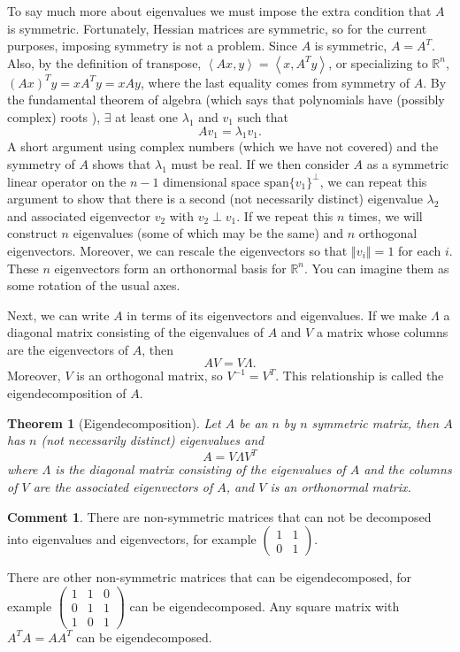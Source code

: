 \documentclass[12pt,reqno]{amsart}
\newtheorem{theorem}{Theorem}[section]
\theoremstyle{definition}
\newtheorem{remark}{Comment}[section]
\def\R{\mathbb{R}}
\newcommand{\iprod}[2]{\left\langle {#1} , {#2} \right\rangle}
\newcommand{\norm}[1]{\left\Vert {#1} \right\Vert}
\newcommand{\spn}{\mathrm{span}}
\begin{document}
To say much more about eigenvalues we must impose the extra condition
that $A$ is symmetric. Fortunately, Hessian matrices are symmetric, so
for the current purposes, imposing symmetry is not a problem. Since
$A$ is symmetric, $A = A^T$. Also, by the definition of transpose,
$\iprod{ A x}{ y } = \iprod{x}{A^T y}$, or specializing to $\R^n$, $
(Ax)^T y = x A^T y = x A y$, where the last equality comes from
symmetry of $A$.  By the fundamental theorem of algebra (which says
that polynomials have (possibly complex) roots ), $\exists$ at least
one $\lambda_1$ and $v_1$ such that
\[ A v_1 = \lambda_1 v_1. \] 
A short argument using complex numbers (which we have not covered) and
the symmetry of $A$ shows that $\lambda_1$ must be real. If we then
consider $A$ as a symmetric linear operator on the $n-1$ dimensional
space $\spn\{v_1\}^{\perp}$, we can repeat this argument to show that
there is a second (not necessarily distinct) eigenvalue $\lambda_2$
and associated eigenvector $v_2$ with $v_2 \perp v_1$. If we repeat
this $n$ times, we will construct $n$ eigenvalues (some of which may
be the same) and $n$ orthogonal eigenvectors. Moreover, we can rescale
the eigenvectors so that $\norm{v_i} = 1$ for each $i$. These $n$
eigenvectors form an orthonormal basis for $\R^n$. You can imagine
them as some rotation of the usual axes. 

Next, we can write $A$ in terms of its eigenvectors and
eigenvalues. If we make $\Lambda$ a diagonal matrix consisting of the
eigenvalues of $A$ and $V$ a matrix whose columns are the eigenvectors
of $A$, then
\[ A V = V \Lambda. \] 
Moreover, $V$ is an orthogonal matrix, so
$V^{-1} = V^T$. This relationship is called the eigendecomposition of
$A$.
\begin{theorem}[Eigendecomposition]\label{thm:eigen}
  Let $A$ be an $n$ by $n$ symmetric matrix, then $A$ has $n$ (not
  necessarily distinct) eigenvalues and 
  \[ A = V \Lambda V^T \] 
  where $\Lambda$ is the diagonal matrix
  consisting of the eigenvalues of $A$ and the columns of $V$ are the
  associated eigenvectors of $A$, and $V$ is an orthonormal matrix. 
\end{theorem}
\begin{remark}
  There are non-symmetric matrices that can not be decomposed into
  eigenvalues and eigenvectors, for example $\begin{pmatrix} 1 & 1 \\
    0 & 1 \end{pmatrix}$. 
  
  There are other non-symmetric matrices that can be eigendecomposed,
  for example $\begin{pmatrix} 1 & 1 & 0 \\ 0 & 1 & 1 \\ 1 & 0 & 1
  \end{pmatrix}$ can be eigendecomposed. Any square matrix with $A^T A
  = A A^T$ can be eigendecomposed.
\end{remark}
\end{document}
